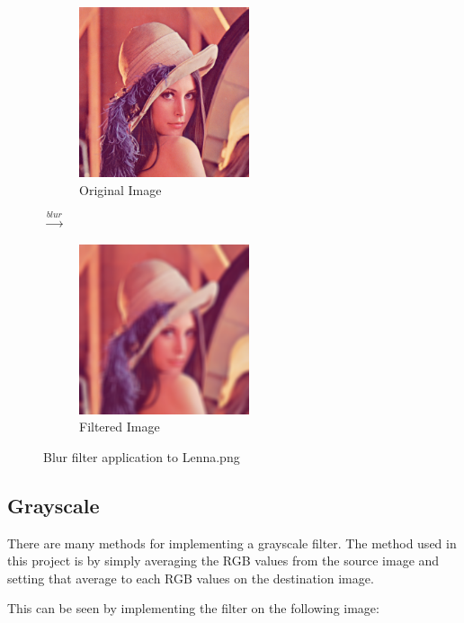 \documentclass[a4paper,12pt]{article}
\begin{document}
	\begin{figure}[H]
		\centering
		\begin{subfigure}{.47\textwidth}
			\centering
			\includegraphics[width=5cm]{Lenna.png}
			\caption{Original Image}
		\end{subfigure}%
		{\LARGE$\xrightarrow{blur}$}%
		\begin{subfigure}{.47\textwidth}
			\centering
			\includegraphics[width=5cm]{jv_blur_Lenna.png}
			\caption{Filtered Image}
		\end{subfigure}

		\caption{Blur filter application to Lenna.png}
	\end{figure}			
	
	\subsection{Grayscale}
	
	There are many methods for implementing a grayscale filter. The method used in this project is by simply averaging the RGB values from the source image and setting that average to each RGB values on the destination image.
	
	This can be seen by implementing the filter on the following image:	
	
\end{document}
